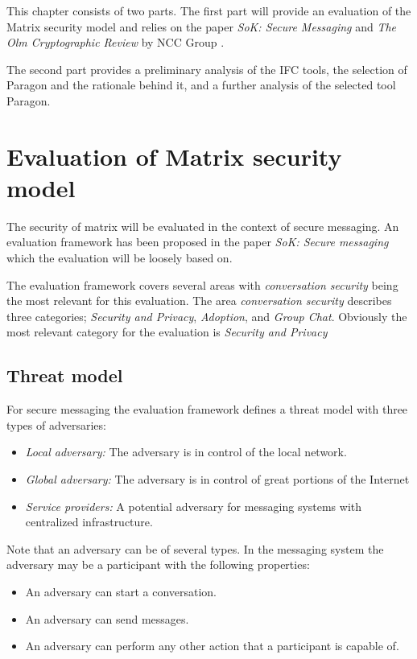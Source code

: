 This chapter consists of two parts. The first part will provide an evaluation of the Matrix security model and relies on the paper \emph{SoK: Secure Messaging} \cite{sok} and \emph{The Olm Cryptographic Review} by NCC Group \cite{ncc}. 

The second part provides a preliminary analysis of the IFC tools, the selection of Paragon and the rationale behind it, and a further analysis of the selected tool Paragon.


\section{Evaluation of Matrix security model}
The security of matrix will be evaluated in the context of secure messaging. An evaluation framework has been proposed in the paper \emph{SoK: Secure messaging} which the evaluation will be loosely based on. 

The evaluation framework covers several areas with \emph{conversation security} being the most relevant for this evaluation. The area \emph{conversation security} describes three categories; \emph{Security and Privacy}, \emph{Adoption}, and \emph{Group Chat}. Obviously the most relevant category for the evaluation is \emph{Security and Privacy}

\subsection{Threat model}
For secure messaging the evaluation framework defines a threat model with three types of adversaries:

\begin{itemize}
	\item \emph{Local adversary:} The adversary is in control of the local network.
	\item \emph{Global adversary:} The adversary is in control of great portions of the Internet 
	\item \emph{Service providers:} A potential adversary for messaging systems with centralized infrastructure.
\end{itemize}
Note that an adversary can be of several types.
In the messaging system the adversary may be a participant with the following properties:

\begin{itemize}
	\item An adversary can start a conversation.
	\item An adversary can send messages.
	\item An adversary can perform any other action that a participant is capable of.
\end{itemize}

